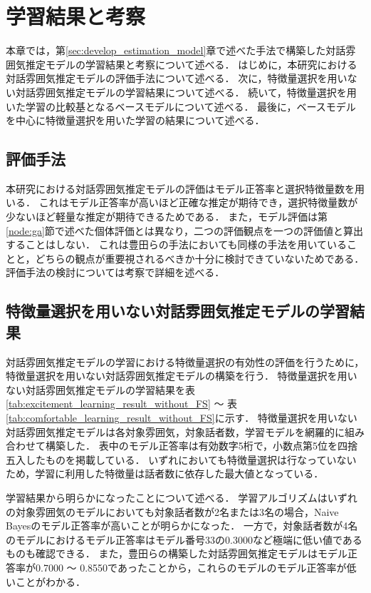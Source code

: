\chapter{学習結果と考察\label{sec:evaluate_estimation_model}}
\thispagestyle{plain}

本章では，第\ref{sec:develop_estimation_model}章で述べた手法で構築した対話雰囲気推定モデルの学習結果と考察について述べる．
はじめに，本研究における対話雰囲気推定モデルの評価手法について述べる．
次に，特徴量選択を用いない対話雰囲気推定モデルの学習結果について述べる．
続いて，特徴量選択を用いた学習の比較基となるベースモデルについて述べる．
最後に，ベースモデルを中心に特徴量選択を用いた学習の結果について述べる．

\section{評価手法}

本研究における対話雰囲気推定モデルの評価はモデル正答率と選択特徴量数を用いる．
これはモデル正答率が高いほど正確な推定が期待でき，選択特徴量数が少ないほど軽量な推定が期待できるためである．
また，モデル評価は第\ref{node:ga}節で述べた個体評価とは異なり，二つの評価観点を一つの評価値と算出することはしない．
これは豊田らの手法においても同様の手法を用いていることと，どちらの観点が重要視されるべきか十分に検討できていないためである．
評価手法の検討については考察で詳細を述べる．

\section{特徴量選択を用いない対話雰囲気推定モデルの学習結果\label{node:learning_result_without_ga}}

対話雰囲気推定モデルの学習における特徴量選択の有効性の評価を行うために，特徴量選択を用いない対話雰囲気推定モデルの構築を行う．
特徴量選択を用いない対話雰囲気推定モデルの学習結果を表\ref{tab:excitement_learning_result_without_FS} 〜 表\ref{tab:comfortable_learning_result_without_FS}に示す．
特徴量選択を用いない対話雰囲気推定モデルは各対象雰囲気，対象話者数，学習モデルを網羅的に組み合わせて構築した．
表中のモデル正答率は有効数字5桁で，小数点第5位を四捨五入したものを掲載している．
いずれにおいても特徴量選択は行なっていないため，学習に利用した特徴量は話者数に依存した最大値となっている．

学習結果から明らかになったことについて述べる．
学習アルゴリズムはいずれの対象雰囲気のモデルにおいても対象話者数が2名または3名の場合，Naive Bayesのモデル正答率が高いことが明らかになった．
一方で，対象話者数が4名のモデルにおけるモデル正答率はモデル番号33の0.3000など極端に低い値であるものも確認できる．
また，豊田らの構築した対話雰囲気推定モデルはモデル正答率が0.7000 〜 0.8550であったことから，これらのモデルのモデル正答率が低いことがわかる．

